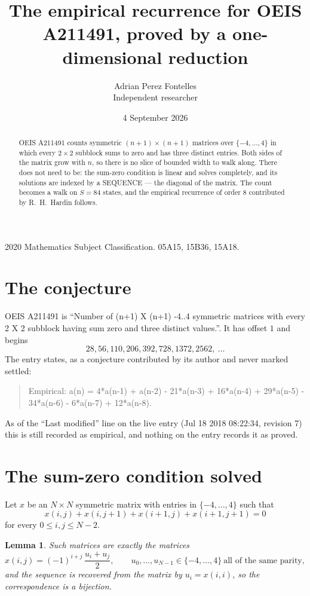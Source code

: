 \documentclass[11pt,a4paper]{article}
\title{The empirical recurrence for OEIS A211491, proved by a one-dimensional reduction}
\author{Adrian Perez Fontelles\\ \small Independent researcher}
\date{4 September 2026}
\theoremstyle{plain}
\newtheorem{lemma}[theorem]{Lemma}
\theoremstyle{definition}
\begin{document}
\maketitle

\begin{abstract}
OEIS A211491 counts symmetric $(n+1)\times(n+1)$ matrices over
$\{-4,\dots,4\}$ in which every $2\times2$ subblock sums to zero and has three distinct
entries. Both sides of the matrix grow with $n$, so there is no slice of bounded width to walk
along. There does not need to be: the sum-zero condition is linear and solves completely, and
its solutions are indexed by a SEQUENCE --- the diagonal of the matrix. The count becomes a walk
on $S=84$ states, and the empirical recurrence of order $8$ contributed by R.~H.~Hardin
follows.
\end{abstract}

\noindent\small 2020 Mathematics Subject Classification. 05A15, 15B36, 15A18.\normalsize

\section{The conjecture}

OEIS A211491 is ``Number of (n+1) X (n+1) -4..4 symmetric matrices with every 2 X 2 subblock having sum zero and three distinct values.''. It has offset $1$ and begins
\[
28, 56, 110, 206, 392, 728, 1372, 2562,\ \dots
\]
The entry states, as a conjecture contributed by its author and never marked settled:
\begin{quote}
Empirical: a(n) = 4*a(n-1) + a(n-2) - 21*a(n-3) + 16*a(n-4) + 29*a(n-5) - 34*a(n-6) - 6*a(n-7) + 12*a(n-8).
\end{quote}
As of the ``Last modified'' line on the live entry (Jul 18 2018 08:22:34, revision 7) this is still
recorded as empirical, and nothing on the entry records it as proved.

\section{The sum-zero condition solved}

Let $x$ be an $N\times N$ symmetric matrix with entries in $\{-4,\dots,4\}$ such that
\[
x(i,j)+x(i,j{+}1)+x(i{+}1,j)+x(i{+}1,j{+}1)=0
\]
for every $0\le i,j\le N-2$.

\begin{lemma}\label{lem:solve}
Such matrices are exactly the matrices
\[
x(i,j)=(-1)^{i+j}\,\frac{u_i+u_j}{2},
\qquad u_0,\dots,u_{N-1}\in\{-4,\dots,4\}\ \text{all of the same parity},
\]
and the sequence is recovered from the matrix by $u_i=x(i,i)$, so the correspondence is a
bijection.
\end{lemma}
\end{document}
